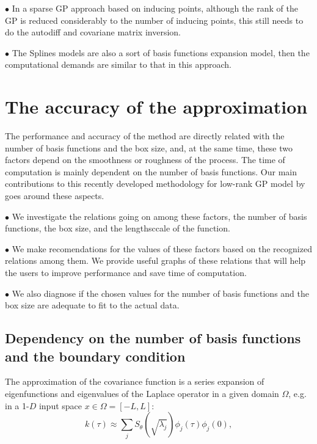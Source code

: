 \documentclass[]{interact}
\theoremstyle{plain}%
\theoremstyle{definition}
\theoremstyle{remark}
\begin{document}
\vspace{2mm}
$\bullet$ In a sparse GP approach based on inducing points, although the rank of the GP is reduced considerably to the number of inducing points, this still needs to do the autodiff and covariane matrix inversion.

\vspace{2mm}
$\bullet$ The Splines models are also a sort of basis functions expansion model, then the computational demands are similar to that in this approach.


\section{The accuracy of the approximation}

The performance and accuracy of the method are directly related with the number of basis functions and the box size, and, at the same time, these two factors depend on the smoothness or roughness of the process. The time of computation is mainly dependent on the number of basis functions. Our main contributions to this recently developed methodology for low-rank GP model by \cite{solin2018hilbert} goes around these aspects.

\vspace{2mm}
$\bullet$ We investigate the relations going on among these factors, the number of basis functions, the box size, and the lengthsccale of the function.

\vspace{2mm}
$\bullet$ We make recomendations for the values of these factors based on the recognized relations among them. We provide useful graphs of these relations that will help the users to improve performance and save time of computation.

\vspace{2mm}
$\bullet$ We also diagnose if the chosen values for the number of basis functions and the box size are adequate to fit to the actual data.


\subsection{Dependency on the number of basis functions and the boundary condition}

The approximation of the covariance function is a series expansion of eigenfunctions and eigenvalues of the Laplace operator in a given domain $\Omega$, e.g. in a 1-$D$ input space $x\in \Omega=[-L,L]$:
%
\begin{equation}\label{diffcov}
k(\tau) \approx \sum_{j}S_{\theta}(\sqrt{\lambda_j}) \phi_j(\tau) \phi_j(0),  \nonumber
\end{equation} 
\end{document}
